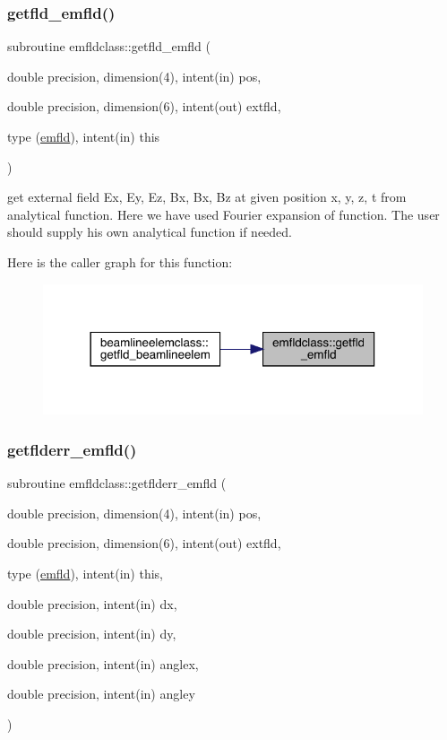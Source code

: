 \subsubsection{\texorpdfstring{getfld\_emfld()}{getfld\_emfld()}}
{\footnotesize\ttfamily subroutine emfldclass\+::getfld\+\_\+emfld (\begin{DoxyParamCaption}\item[{double precision, dimension(4), intent(in)}]{pos,  }\item[{double precision, dimension(6), intent(out)}]{extfld,  }\item[{type (\mbox{\hyperlink{namespaceemfldclass_structemfldclass_1_1emfld}{emfld}}), intent(in)}]{this }\end{DoxyParamCaption})}



get external field Ex, Ey, Ez, Bx, Bx, Bz at given position x, y, z, t from analytical function. Here we have used Fourier expansion of function. The user should supply his own analytical function if needed. 

Here is the caller graph for this function\+:\nopagebreak
\begin{figure}[H]
\begin{center}
\leavevmode
\includegraphics[width=318pt]{namespaceemfldclass_aa0023b4b2c7a17c75becc20eeb9be23c_icgraph}
\end{center}
\end{figure}
\mbox{\label{namespaceemfldclass_ad7628b9fdaf5e839e55f71c3f8678c11}} 
\subsubsection{\texorpdfstring{getflderr\_emfld()}{getflderr\_emfld()}}
{\footnotesize\ttfamily subroutine emfldclass\+::getflderr\+\_\+emfld (\begin{DoxyParamCaption}\item[{double precision, dimension(4), intent(in)}]{pos,  }\item[{double precision, dimension(6), intent(out)}]{extfld,  }\item[{type (\mbox{\hyperlink{namespaceemfldclass_structemfldclass_1_1emfld}{emfld}}), intent(in)}]{this,  }\item[{double precision, intent(in)}]{dx,  }\item[{double precision, intent(in)}]{dy,  }\item[{double precision, intent(in)}]{anglex,  }\item[{double precision, intent(in)}]{angley }\end{DoxyParamCaption})}



